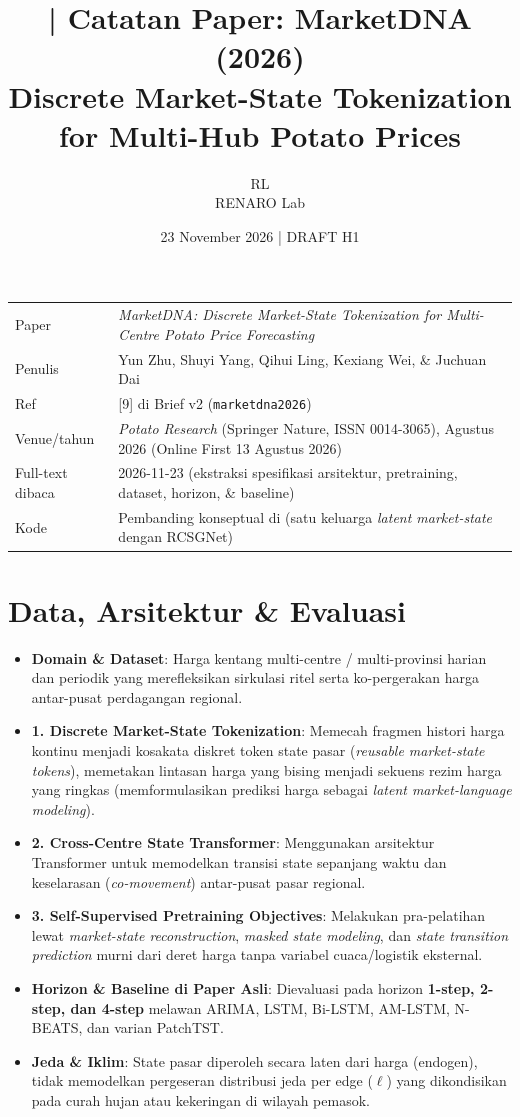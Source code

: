 \documentclass[11pt,a4paper]{article}
\title{\jobid{RL-H1-02} | Catatan Paper: MarketDNA (2026)\\
\large Discrete Market-State Tokenization for Multi-Hub Potato Prices}
\author{RL \\ \small RENARO Lab}
\date{23 November 2026 \quad | \quad \textcolor{blue!65!black}{DRAFT H1}}
\begin{document}
\maketitle

\begin{table}[H]
\centering
\small
\begin{tabular}{@{}L{3.4cm}L{11.2cm}@{}}
\toprule
Paper & \emph{MarketDNA: Discrete Market-State Tokenization for Multi-Centre Potato Price Forecasting} \\
Penulis & Yun Zhu, Shuyi Yang, Qihui Ling, Kexiang Wei, \& Juchuan Dai \\
Ref & [9] di Brief v2 (\texttt{marketdna2026}) \\
Venue/tahun & \emph{Potato Research} (Springer Nature, ISSN 0014-3065), Agustus 2026 (Online First 13 Agustus 2026) \\
Full-text dibaca & 2026-11-23 (ekstraksi spesifikasi arsitektur, pretraining, dataset, horizon, \& baseline) \\
Kode & Pembanding konseptual di  (satu keluarga \emph{latent market-state} dengan RCSGNet) \\
\bottomrule
\end{tabular}
\end{table}

\section{Data, Arsitektur \& Evaluasi}
\begin{itemize}
  \item \textbf{Domain \& Dataset}: Harga kentang multi-centre / multi-provinsi harian dan periodik yang merefleksikan sirkulasi ritel serta ko-pergerakan harga antar-pusat perdagangan regional.
  \item \textbf{1. Discrete Market-State Tokenization}: Memecah fragmen histori harga kontinu menjadi kosakata diskret token state pasar (\emph{reusable market-state tokens}), memetakan lintasan harga yang bising menjadi sekuens rezim harga yang ringkas (memformulasikan prediksi harga sebagai \emph{latent market-language modeling}).
  \item \textbf{2. Cross-Centre State Transformer}: Menggunakan arsitektur Transformer untuk memodelkan transisi state sepanjang waktu dan keselarasan (\emph{co-movement}) antar-pusat pasar regional.
  \item \textbf{3. Self-Supervised Pretraining Objectives}: Melakukan pra-pelatihan lewat \emph{market-state reconstruction}, \emph{masked state modeling}, dan \emph{state transition prediction} murni dari deret harga tanpa variabel cuaca/logistik eksternal.
  \item \textbf{Horizon \& Baseline di Paper Asli}: Dievaluasi pada horizon \textbf{1-step, 2-step, dan 4-step} melawan ARIMA, LSTM, Bi-LSTM, AM-LSTM, N-BEATS, dan varian PatchTST.
  \item \textbf{Jeda \& Iklim}: State pasar diperoleh secara laten dari harga (endogen), tidak memodelkan pergeseran distribusi jeda per edge ($\ell$) yang dikondisikan pada curah hujan atau kekeringan di wilayah pemasok.
\end{itemize}
\end{document}
